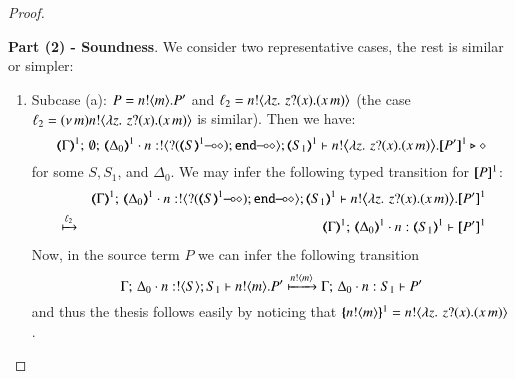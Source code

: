 \begin{proof}
\begin{enumerate}[1.]

%
		
\end{enumerate}
%
\noi \textbf{Part (2) - Soundness}. We consider two representative cases, the rest is similar or simpler:
%
\begin{enumerate}[1.]
	\item Subcase (a): $P = n ! \langle m \rangle . P'$ and $\ell_2 = n ! \langle \lambda z.\,\,z ? (x) . (x\, {m}) \rangle$
	(the case $\ell_2 = (\nu\, m)n ! \langle \lambda z.\,\,z ? (x) . (x\, {m}) \rangle$ is similar).
		Then 
		we have: %
%
		\[
			\mapt{\Gamma}^{1};\, \emptyset;\, \mapt{\Delta_0}^{1} \cat 
			n: \btout{\lhot{\btinp{\lhot{\tmap{S}{1}}}\tinact}} \tmap{S_1}{1} 
			\proves 
			 \bbout{n}{ \abs{z}{\,\binp{z}{x} (\appl{x}{m})} } \pmap{P'}{1} 
			 \hastype \Proc
		\]
%
		for some $S, S_1$, and $\Delta_0$. 
		We may infer the following typed transition for $[\!\![P]\!\!]^1$:
%
		\begin{eqnarray*}
			& & \mapt{\Gamma}^{1};\, \mapt{\Delta_0}^{1} \cat n: \btout{\lhot{\btinp{\lhot{\tmap{S}{1}}}\tinact}} \tmap{S_1}{1} 
			\proves 
			 \bbout{n}{ \abs{z}{\,\binp{z}{x} (\appl{x}{m})} } \pmap{P'}{1} 
			 \\
			&\hby{\ell_2}& 
			\mapt{\Gamma}^{1};\, \mapt{\Delta_0}^{1} \cat n: \tmap{S_1}{1} 
			\proves  \pmap{P'}{1} 
		\end{eqnarray*}
%
		Now, in the source term $P$ we can infer the following transition 
%
		\[
		\Gamma;\,  \Delta_0 \cdot n:! \langle S \rangle ; S_1 \vdash n ! \langle m \rangle . P'
		 \xmapsto{n !\langle m \rangle} 
		 \Gamma;\,  \Delta_0 \cdot n: S_1 \vdash P'
		\]
%
		and thus the thesis follows easily by noticing that 
		$\{\!\!\{n ! \langle m \rangle\}\!\!\}^{1} = n ! \langle \lambda z.\,\,z ? (x) . (x\, {m}) \rangle$.



\end{enumerate}
\end{proof}
